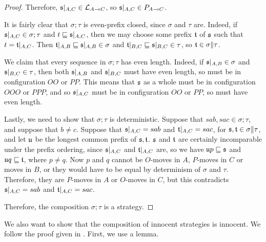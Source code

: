 \begin{proof}
  Therefore, $\mathfrak s\vert_{A,C}\in \mathcal L_{A\multimap C}$, so $\mathfrak s\vert_{A,C}\in P_{A\multimap C}$.

  It is fairly clear that $\sigma;\tau$ is even-prefix closed, since $\sigma$ and $\tau$ are.  
  Indeed, if $\mathfrak s\vert_{A,C}\in\sigma;\tau$ and $t\sqsubseteq\mathfrak s\vert_{A,C}$, then we may choose some prefix $\mathfrak t$ of $\mathfrak s$ such that $t=\mathfrak t\vert_{A,C}$.  
  Then $\mathfrak t\vert_{A,B}\sqsubseteq\mathfrak s\vert_{A,B}\in\sigma$ and $\mathfrak t\vert_{B,C}\sqsubseteq\mathfrak s\vert_{B,C}\in\tau$, so $\mathfrak t\in\sigma\|\tau$.

  We claim that every sequence in $\sigma;\tau$ has even length.  
  Indeed, if $\mathfrak s\vert_{A,B}\in\sigma$ and $\mathfrak s\vert_{B,C}\in\tau$, then both $\mathfrak s\vert_{A,B}$ and $\mathfrak s\vert_{B,C}$ must have even length, so must be in configuration $OO$ or $PP$.  
  This means that $\mathfrak s$ as a whole must be in configuration $OOO$ or $PPP$, and so $\mathfrak s\vert_{A,C}$ must be in configuration $OO$ or $PP$, so must have even length.

  Lastly, we need to show that $\sigma;\tau$ is deterministic.  
  Suppose that $sab,sac\in\sigma;\tau$, and suppose that $b\ne c$.  
  Suppose that $\mathfrak s\vert_{A,C}=sab$ and $\mathfrak t\vert_{A,C}=sac$, for $\mathfrak s,\mathfrak t\in\sigma\|\tau$, and let $\mathfrak u$ be the longest common prefix of $\mathfrak s,\mathfrak t$.
  $\mathfrak s$ and $\mathfrak t$ are certainly incomparable under the prefix ordering, since $\mathfrak s\vert_{A,C}$ and $\mathfrak t\vert_{A,C}$ are, so we have $\mathfrak u p\sqsubseteq \mathfrak s$ and $\mathfrak u q\sqsubseteq \mathfrak t$, where $p\ne q$.
  Now $p$ and $q$ cannot be $O$-moves in $A$, $P$-moves in $C$ or moves in $B$, or they would have to be equal by determinism of $\sigma$ and $\tau$.  
  Therefore, they are $P$-moves in $A$ or $O$-moves in $C$, but this contradicts $\mathfrak s\vert_{A,C}=sab$ and $\mathfrak t\vert_{A,C}=sac$.

  Therefore, the composition $\sigma;\tau$ is a strategy.  
\end{proof}

We also want to show that the composition of innocent strategies is innocent.
We follow the proof given in \cite{Harmer2006InnocentGS}.  
First, we use a lemma.

